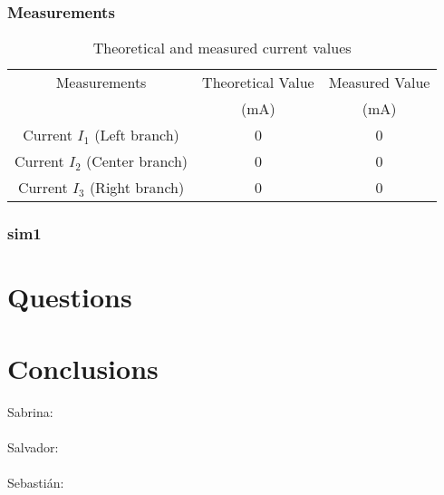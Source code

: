 \documentclass[a4paper]{article}
\begin{document}
\subsubsection{Measurements}
\begin{table}[H]
    \centering
    \begin{tabular}{|c|c|c|}\hline
        Measurements & Theoretical Value & Measured Value\\
        & (\si{\milli\ampere}) & (\si{\milli\ampere})\\\hline 
        Current $I_1$ (Left branch) & 0 & 0 \\\hline
        Current $I_2$ (Center branch) & 0 & 0 \\\hline
        Current $I_3$ (Right branch) & 0 & 0 \\\hline
    \end{tabular}
    \caption{Theoretical and measured current values}
    \label{table:2}
\end{table}
\begin{table}[H]
    \centering
    \caption{Theoretical and measured voltage values}
    \label{table:3}
\end{table}
\subsubsection{sim1}
\section{Questions}
\section{Conclusions}
{\large Sabrina:}\\
\\[2ex]
{\large Salvador:}\\
\\[2ex]
{\large Sebastián:}\\
\end{document}
